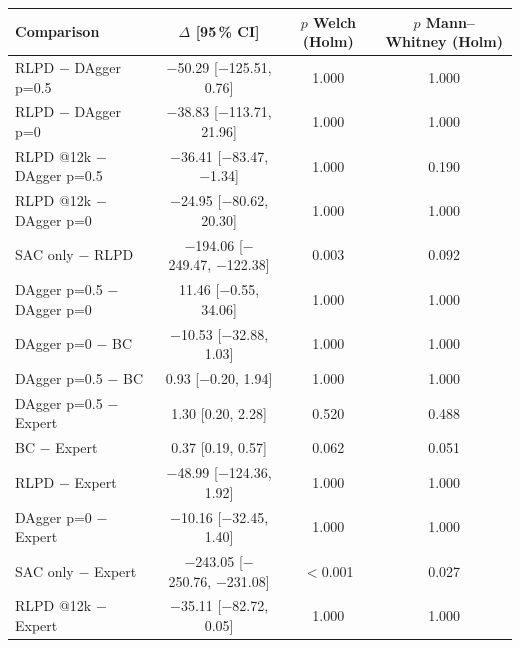\begin{tabular}{lccc}
\toprule
Comparison & $\Delta$ [95\,\% CI] & $p$ Welch (Holm) & $p$ Mann--Whitney (Holm) \\
\midrule
RLPD $-$ DAgger p=0.5 & $-$50.29 [$-$125.51, 0.76] & 1.000 & 1.000 \\
RLPD $-$ DAgger p=0 & $-$38.83 [$-$113.71, 21.96] & 1.000 & 1.000 \\
RLPD @12k $-$ DAgger p=0.5 & $-$36.41 [$-$83.47, $-$1.34] & 1.000 & 0.190 \\
RLPD @12k $-$ DAgger p=0 & $-$24.95 [$-$80.62, 20.30] & 1.000 & 1.000 \\
SAC only $-$ RLPD & $-$194.06 [$-$249.47, $-$122.38] & 0.003 & 0.092 \\
DAgger p=0.5 $-$ DAgger p=0 & 11.46 [$-$0.55, 34.06] & 1.000 & 1.000 \\
DAgger p=0 $-$ BC & $-$10.53 [$-$32.88, 1.03] & 1.000 & 1.000 \\
DAgger p=0.5 $-$ BC & 0.93 [$-$0.20, 1.94] & 1.000 & 1.000 \\
DAgger p=0.5 $-$ Expert & 1.30 [0.20, 2.28] & 0.520 & 0.488 \\
BC $-$ Expert & 0.37 [0.19, 0.57] & 0.062 & 0.051 \\
RLPD $-$ Expert & $-$48.99 [$-$124.36, 1.92] & 1.000 & 1.000 \\
DAgger p=0 $-$ Expert & $-$10.16 [$-$32.45, 1.40] & 1.000 & 1.000 \\
SAC only $-$ Expert & $-$243.05 [$-$250.76, $-$231.08] & $<$0.001 & 0.027 \\
RLPD @12k $-$ Expert & $-$35.11 [$-$82.72, 0.05] & 1.000 & 1.000 \\
\bottomrule
\end{tabular}
